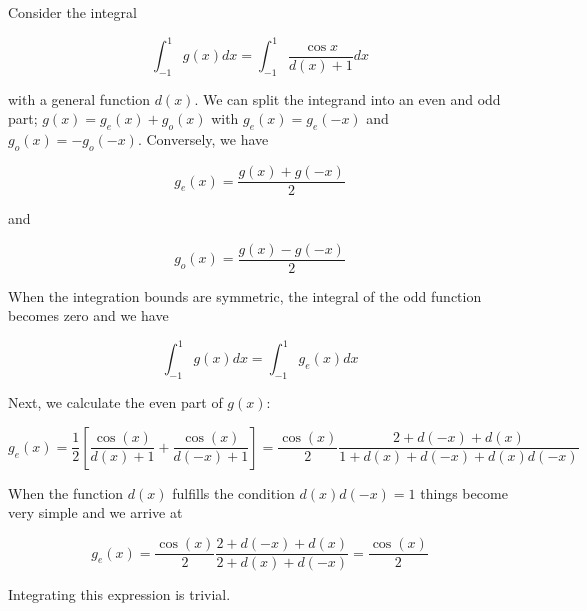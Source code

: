 
Consider the integral

\[
\int_{-1}^1 g(x) dx = \int_{-1}^1 \frac{\cos x}{d(x)+1} dx
\]

with a general function \(d(x)\). We can split the integrand into an
even and odd part; \(g(x) = g_e(x) + g_o(x)\) with \(g_e(x) = g_e(-x)\)
and \(g_o(x) = -g_o(-x)\). Conversely, we have

\[
g_e(x) = \frac{g(x) + g(-x)}{2}
\]

and

\[
g_o(x) = \frac{g(x) - g(-x)}{2}
\]

When the integration bounds are symmetric, the integral of the odd
function becomes zero and we have

\[
\int_{-1}^1 g(x) dx = \int_{-1}^1 g_e(x) dx
\]

Next, we calculate the even part of \(g(x)\):

\[
g_e(x) = \frac{1}{2} \left[ \frac{\cos(x)}{d(x) + 1} + \frac{\cos(x)}{d(-x) + 1}\right] = \frac{\cos(x)}{2}  \frac{2 + d(-x) + d(x)}{ 1 + d(x) + d(-x) + d(x)d(-x) }
\]

When the function \(d(x)\) fulfills the condition \(d(x)d(-x) = 1\)
things become very simple and we arrive at

\[
g_e(x) = \frac{\cos(x)}{2}  \frac{2 + d(-x) + d(x)}{ 2 + d(x) + d(-x) } = \frac{\cos(x)}{2}
\]

Integrating this expression is trivial.
